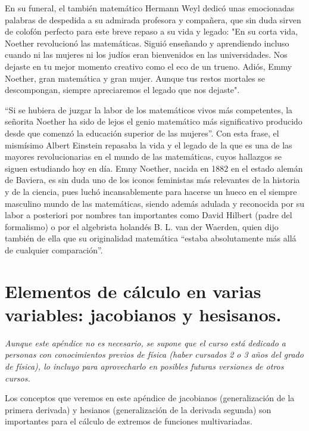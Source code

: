 \begin{small}
En su funeral, el también matemático Hermann Weyl dedicó unas emocionadas palabras de despedida a su admirada profesora y compañera, que sin duda sirven de colofón perfecto para este breve repaso a su vida y legado: "En su corta vida, Noether revolucionó las matemáticas. Siguió enseñando y aprendiendo incluso cuando ni las mujeres ni los judíos eran bienvenidos en las universidades. Nos dejaste en tu mejor momento creativo como el eco de un trueno. Adiós, Emmy Noether, gran matemática y gran mujer. Aunque tus restos mortales se descompongan, siempre apreciaremos el legado que nos dejaste". 



``Si se hubiera de juzgar la labor de los matemáticos vivos más competentes, la señorita Noether ha sido de lejos el genio matemático más significativo producido desde que comenzó la educación superior de las mujeres''. Con esta frase, el mismísimo Albert Einstein repasaba la vida y el legado de la que es una de las mayores revolucionarias en el mundo de las matemáticas, cuyos hallazgos se siguen estudiando hoy en día. Emny Noether, nacida en 1882 en el estado alemán de Baviera, es sin duda uno de los iconos feministas más relevantes de la historia y de la ciencia, pues luchó incansablemente para hacerse un hueco en el siempre masculino mundo de las matemáticas, siendo además adulada y reconocida por su labor a posteriori por nombres tan importantes como David Hilbert (padre del formalismo) o por el algebrista holandés B. L. van der Waerden, quien dijo también de ella que su originalidad matemática ``estaba absolutamente más allá de cualquier comparación''.

\end{small}



\chapter{Elementos de cálculo en varias variables: jacobianos y hesisanos.}
\label{ap-CVV}

\textcolor{gris}{\emph{Aunque este apéndice no es necesario, se supone que el curso está dedicado a personas con conocimientos previos de física (haber cursados 2 o 3 años del grado de física), lo incluyo para aprovecharlo en posibles futuras versiones de otros cursos.}}

Los conceptos que veremos en este apéndice de jacobianos (generalización de la primera derivada) y hesianos (generalización de la derivada segunda) son importantes para el cálculo de extremos de funciones multivariadas.



